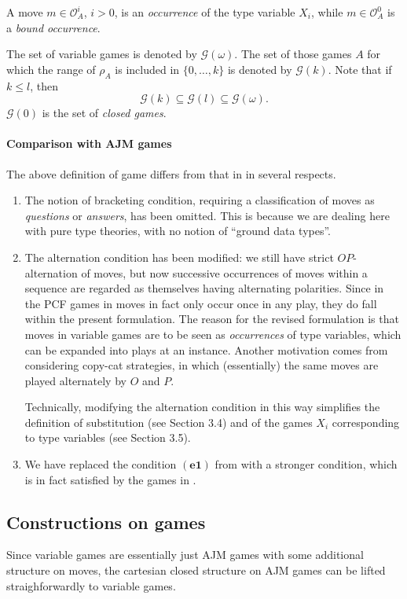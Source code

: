 \documentclass[a4paper,11pt]{article}
\newcommand{\GG}[1]{\mathcal{G}(#1)}
\newcommand{\Occ}{\mathcal{O}}
\begin{document}
\noindent
A move $m \in \Occ_A^i$, $i > 0$, is an \emph{occurrence} of the type
variable $X_i$, while $m \in \Occ_A^0$ is a \emph{bound occurrence}.

The set of variable games is denoted by $\GG{\omega}$. The set of
those games $A$ for which the range of $\rho_A$ is included in $\{ 0,
\ldots , k \}$ is denoted by $\GG{k}$. Note that if $k \leq l$, then
\[ \GG{k} \subseteq \GG{l} \subseteq \GG{\omega} . \]
$\GG{0}$ is the set of \emph{closed games}.

\paragraph{Comparison with AJM games}
The above definition of game differs from that in \cite{AJM00} in
several respects.
\begin{enumerate}
\item The notion of bracketing condition, requiring a classification
  of moves as \emph{questions} or \emph{answers}, has been
  omitted. This is because we are dealing here with pure type
  theories, with no notion of ``ground data types''.
\item The alternation condition has been modified: we still have
  strict $OP$-alternation of moves, but now successive occurrences of
  moves within a sequence are regarded as themselves having
  alternating polarities. Since in the PCF games in \cite{AJM00} moves
  in fact only occur once in any play, they do fall within the present
  formulation. The reason for the revised formulation is that moves
  in variable games are to be seen as \emph{occurrences} of type variables,
  which can be expanded into plays at an instance. Another motivation
  comes from considering copy-cat strategies, in which (essentially)
  the same moves are
  played alternately by $O$ and $P$.

Technically, modifying the alternation condition in this way simplifies
the definition of substitution (see Section 3.4) and of the games
$X_i$ corresponding to type variables (see Section 3.5).

\item We have replaced the condition $\mathbf{(e1)}$ from \cite{AJM00}
  with a stronger condition, which is in fact satisfied by the games in
  \cite{AJM00}.
\end{enumerate}

\subsection{Constructions on games}
Since variable games are essentially just AJM games with some
additional structure on moves, the cartesian closed structure on AJM games
can be lifted straighforwardly to variable games.
\end{document}
